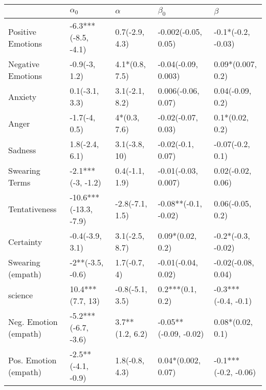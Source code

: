 \begin{tabular}{lllll}
\toprule
{} &             $\alpha_0$ &         $\alpha$ &              $\beta_0$ &               $\beta$ \\
\midrule
Positive Emotions     &    -6.3***(-8.5, -4.1) &   0.7(-2.9, 4.3) &    -0.002(-0.05, 0.05) &    -0.1*(-0.2, -0.03) \\
Negative Emotions     &          -0.9(-3, 1.2) &   4.1*(0.8, 7.5) &    -0.04(-0.09, 0.003) &     0.09*(0.007, 0.2) \\
Anxiety               &         0.1(-3.1, 3.3) &   3.1(-2.1, 8.2) &     0.006(-0.06, 0.07) &      0.04(-0.09, 0.2) \\
Anger                 &          -1.7(-4, 0.5) &     4*(0.3, 7.6) &     -0.02(-0.07, 0.03) &       0.1*(0.02, 0.2) \\
Sadness               &         1.8(-2.4, 6.1) &    3.1(-3.8, 10) &      -0.02(-0.1, 0.07) &      -0.07(-0.2, 0.1) \\
Swearing Terms        &      -2.1***(-3, -1.2) &   0.4(-1.1, 1.9) &    -0.01(-0.03, 0.007) &     0.02(-0.02, 0.06) \\
Tentativeness         &  -10.6***(-13.3, -7.9) &  -2.8(-7.1, 1.5) &   -0.08**(-0.1, -0.02) &      0.06(-0.05, 0.2) \\
Certainty             &        -0.4(-3.9, 3.1) &   3.1(-2.5, 8.7) &       0.09*(0.02, 0.2) &    -0.2*(-0.3, -0.02) \\
Swearing (empath)     &       -2**(-3.5, -0.6) &     1.7(-0.7, 4) &     -0.01(-0.04, 0.02) &    -0.02(-0.08, 0.04) \\
science               &       10.4***(7.7, 13) &  -0.8(-5.1, 3.5) &       0.2***(0.1, 0.2) &   -0.3***(-0.4, -0.1) \\
Neg. Emotion (empath) &    -5.2***(-6.7, -3.6) &  3.7**(1.2, 6.2) &  -0.05**(-0.09, -0.02) &      0.08*(0.02, 0.1) \\
Pos. Emotion (empath) &     -2.5**(-4.1, -0.9) &   1.8(-0.8, 4.3) &     0.04*(0.002, 0.07) &  -0.1***(-0.2, -0.06) \\
\bottomrule
\end{tabular}
